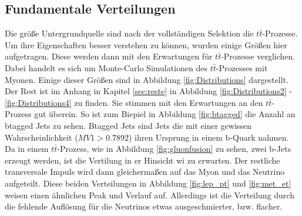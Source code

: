 \subsection{Fundamentale Verteilungen}

Die größe Untergrundquelle sind nach der vollständigen Selektion die $t\bar{t}$-Prozesse.
Um ihre Eigenschaften besser verstehen zu können, wurden einige Größen hier aufgetragen.
Diese werden dann mit den Erwartungen für $t\bar{t}$-Prozesse verglichen.
Dabei handelt es sich um Monte-Carlo Simulationen des $t\bar{t}$-Prozesses mit Myonen.
Einige dieser Größen sind in Abbildung \ref{fig:Distributions} dargestellt.
Der Rest ist im Anhang in Kapitel \ref{sec:reste} in Abbildung \ref{fig:Distributions2} - \ref{fig:Distributions4} zu finden.
Sie stimmen mit den Erwartungen an den $t\bar{t}$-Prozess gut überein.
So ist zum Biepiel in Abbildung \ref{fig:btagged} die Anzahl an btagged Jets zu sehen.
Btagged Jets sind Jets die mit einer gewissen Wahrscheinlichkeit ($MV1 > 0.7892$) ihren Ursprung in einem b-Quark nahmen.
Da in einem $t\bar{t}$-Prozess, wie in Abbildung \ref{fig:gluonfusion} zu sehen, zwei b-Jets erzeugt werden, ist die Vertilung in er Hinsicht wi zu erwarten.
Der restliche transversale Impuls wird dann gleichermaßen auf das Myon und das Neutrino aufgeteilt.
Diese beiden Verteilungen in Abbildung \ref{fig:lep_pt} und \ref{fig:met_et} weisen einen ähnlichen Peak und Verlauf auf.
Allerdings ist die Verteilung durch die fehlende Auflösung für die Neutrinos etwas ausgeschmierter, bzw. flacher.

